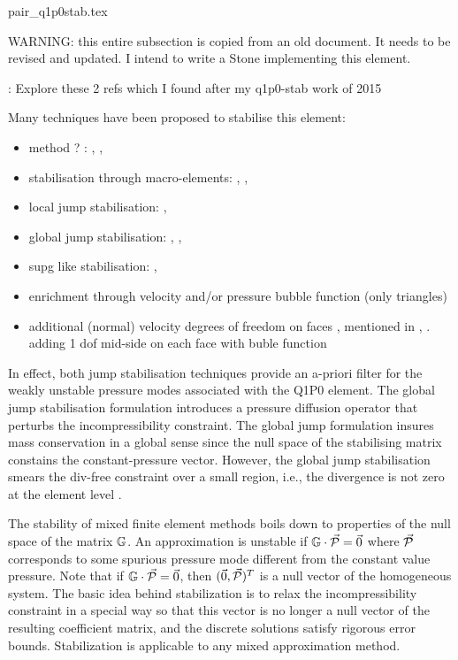 \begin{flushright} {\tiny {\color{gray} pair\_q1p0stab.tex}} \end{flushright}

WARNING: this entire subsection is copied from an old document. It needs to be revised and 
updated. I intend to write a Stone implementing this element.

\Literature: Explore these 2 refs which I found after my q1p0-stab work of 2015 \cite{chke20,eguc03}

Many techniques have been proposed to stabilise this element:

\begin{itemize}
\item method ? : \cite{bbgs04},  \cite{bodg06} , \cite{bogl07}
\item stabilisation through macro-elements: \cite{fobo90}, \cite{leru86}, \cite{leta81}
\item local jump stabilisation: \cite{sike90}, \cite{kesi92,vibo92,qizh07,chri02,chco01,lisi12,lica06}
\item global jump stabilisation: \cite{hufr87}, \cite{nosi98}, \cite{dowa89} \cite{chco01}
\item supg like stabilisation: \cite{teos00}, \cite{tezd92,hufb86}
\item enrichment through velocity and/or pressure bubble function \cite{frol03}(only triangles)
\item additional (normal) velocity degrees of freedom on faces \cite{fofo85}, 
mentioned in \cite{sofo87}, \cite{fort81}.
adding 1 dof mid-side on each face with buble function \cite{rota87}
\end{itemize}

In effect, both jump stabilisation techniques provide an a-priori filter for the weakly unstable pressure modes associated 
with the Q1P0 element. The global jump stabilisation formulation introduces a pressure diffusion operator
that perturbs the incompressibility constraint. The global jump formulation insures mass conservation in a global  
sense since the null space of the stabilising matrix constains the constant-pressure vector. However, the global 
jump stabilisation smears the div-free constraint over a small region, i.e., the divergence is not 
zero at the element level \cite{chri00}.

The stability of mixed finite element methods boils down to properties of the null space of the matrix ${\mathbb{G}}$. 
An approximation is unstable if ${\mathbb{G}} \cdot \vec{\cal P} = \vec{0}$ where $\vec{\cal P}$ 
corresponds to some spurious pressure mode different from the constant value pressure.  
Note that if ${\mathbb{G}}\cdot \vec{\cal P} = \vec{0}$, then $(\vec{0},\vec{\cal P})^T$ is a null vector of 
the homogeneous system. 
The basic idea behind stabilization is to relax the incompressibility constraint in a special way so that 
this vector is no longer a null vector of the resulting coefficient matrix, and 
the discrete solutions satisfy rigorous error bounds. 
Stabilization is applicable to any mixed approximation method. 

